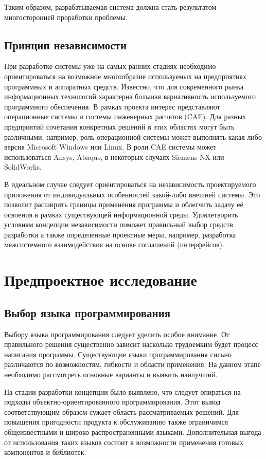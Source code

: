 \documentclass[14pt,oneside,final]{extreport}
\begin{document}
	    Таким образом, разрабатываемая система должна стать результатом многосторонней проработки проблемы. 
	    

	\section{Принцип независимости}
	При разработке системы уже на самых ранних стадиях необходимо ориентироваться на возможное многообразие используемых на  предприятиях программных и аппаратных средств. Известно, что для  современного рынка информационных технологий характерна большая вариативность используемого программного обеспечения. В рамках проекта интерес представляют операционные системы и системы инженерных расчетов (CAE). Для разных предприятий сочетания конкретных решений в этих областях могут быть различными, например, роль операционной системы может выполнять какая либо версия Microsoft Windows или  Linux. В роли CAE системы может использоваться Ansys, Abaqus, в некоторых  случаях Siemens NX или SolidWorks. 
	
	В идеальном случае следует ориентироваться на независимость проектируемого приложения от индивидуальных особенностей какой-либо внешней системы. Это позволит расширить границы применения программы и облегчить задачу её освоения в рамках существующей информационной среды. Удовлетворить условиям концепции независимости поможет правильный выбор средств разработки а также определенные проектные меры, например, разработка межсистемного взаимодействия на основе соглашений (интерфейсов). 
	
	\chapter{Предпроектное исследование}
	\section{Выбор языка программирования}
	Выбору языка программирования следует уделить особое внимание. От правильного решения существенно зависит насколько трудоемким будет процесс написания программы. Существующие языки программирования сильно различаются по возможностям, гибкости и области применения. На данном этапе необходимо рассмотреть основные варианты и выявить наилучший. 
	
	На стадии разработки концепции было выявлено, что следует опираться на подходы объектно-ориентированного программирования. Этот вывод соответствующим образом сужает область рассматриваемых решений. Для повышения пригодности продукта к обслуживанию также ограничимся общеизвестными и широко распространенными языками. Дополнительная выгода от использования таких языков состоит в возможности применения готовых компонентов и библиотек. 
	
\end{document}
